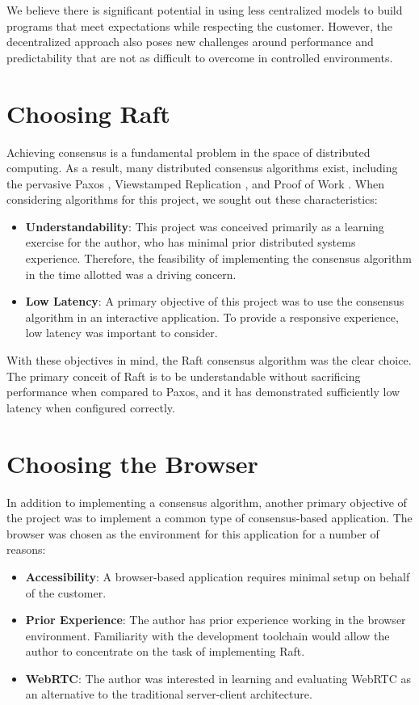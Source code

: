 \documentclass[11pt,twocolumn]{article}
\begin{document}
We believe there is significant potential in using less centralized models to build programs that meet expectations while respecting the customer. However, the decentralized approach also poses new challenges around performance and predictability that are not as difficult to overcome in controlled environments.

\section{Choosing Raft}
Achieving consensus is a fundamental problem in the space of distributed computing. As a result, many distributed consensus algorithms exist, including the pervasive Paxos \cite{paxospaper}, Viewstamped Replication \cite{vsrpaper}, and Proof of Work \cite{powpaper}. When considering algorithms for this project, we sought out these characteristics:
\begin{itemize}
    \item \textbf{Understandability}: This project was conceived primarily as a learning exercise for the author, who has minimal prior distributed systems experience. Therefore, the feasibility of implementing the consensus algorithm in the time allotted was a driving concern.
    \item \textbf{Low Latency}: A primary objective of this project was to use the consensus algorithm in an interactive application. To provide a responsive experience, low latency was important to consider.
\end{itemize}

With these objectives in mind, the Raft consensus algorithm was the clear choice. The primary conceit of Raft is to be understandable without sacrificing performance when compared to Paxos, and it has demonstrated sufficiently low latency when configured correctly.

\section{Choosing the Browser}
In addition to implementing a consensus algorithm, another primary objective of the project was to implement a common type of consensus-based application. The browser was chosen as the environment for this application for a number of reasons:

\begin{itemize}
    \item \textbf{Accessibility}: A browser-based application requires minimal setup on behalf of the customer.
    \item \textbf{Prior Experience}: The author has prior experience working in the browser environment. Familiarity with the development toolchain would allow the author to concentrate on the task of implementing Raft.
    \item \textbf{WebRTC}: The author was interested in learning and evaluating WebRTC as an alternative to the traditional server-client architecture.

\end{itemize}
\end{document}
